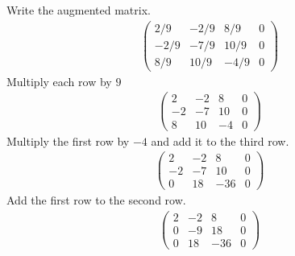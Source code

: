 \documentclass[12pt]{article}
\begin{document}
Write the augmented matrix.
\begin{align*}
\left(\begin{array}{rrr|r}
2 / 9 & -2 / 9 & 8 / 9 & 0 \\
-2 / 9 & -7 / 9 & 10 / 9 & 0 \\
8 / 9 & 10 / 9 & -4 / 9 & 0
\end{array}\right)
\end{align*}
Multiply each row by \(9\)
\begin{align*}
\left(\begin{array}{rrr|r}
2 & -2 & 8 & 0 \\
-2 & -7 & 10 & 0 \\
8 & 10 & -4 & 0
\end{array}\right)
\end{align*}
Multiply the first row by \(-4\) and add it to the third row.
\begin{align*}
\left(\begin{array}{rrr|r}
2 & -2 & 8 & 0 \\
-2 & -7 & 10 & 0 \\
0 & 18 & -36 & 0
\end{array}\right)
\end{align*}
Add the first row to the second row.
\begin{align*}
\left(\begin{array}{rrr|r}
2 & -2 & 8 & 0 \\
0 & -9 & 18 & 0 \\
0 & 18 & -36 & 0
\end{array}\right)
\end{align*}
\end{document}
